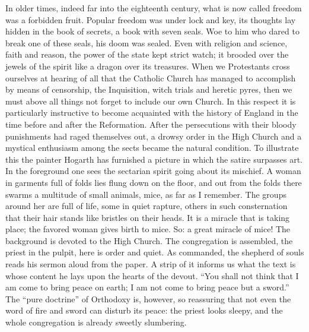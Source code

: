 \documentclass[12pt,a4paper,openany]{book}
\newcommand{\opage}[1]{\marginnote{\footnotesize\textit{[#1]}}}
\begin{document}
In older times, indeed far into the eighteenth
century, what is now called freedom was a forbidden
fruit. Popular freedom was under lock and key,
its thoughts lay hidden in the book of secrets, a
book with seven seals. Woe to him who dared to break one
of these seals, his doom was sealed. Even with religion
and science, faith and reason, the power of the state kept strict
watch; it brooded over the jewels of the spirit like a
dragon over its treasures. When we Protestants cross
\setcounter{footnote}{0}%
\opage{57}ourselves at hearing of all that the Catholic Church has
managed to accomplish by means of censorship, the Inquisition, witch trials
and heretic pyres, then we must above all things not
forget to include our own Church. In this respect it is
particularly instructive to become acquainted with
the history of England in the time before and after the Reformation.
After the persecutions with their bloody punishments had raged themselves out,
a drowsy order in the High Church and a mystical
enthusiasm among the sects became the natural condition. To
illustrate this the painter Hogarth has furnished
a picture in which the satire surpasses art. In the foreground
one sees the sectarian spirit going about its mischief. A
woman in garments full of folds lies flung down on the floor,
and out from the folds there swarms a multitude of small animals,
mice, as far as I remember. The groups around her
are full of life, some in quiet rapture, others in
such consternation that their hair stands like bristles
on their heads. It is a miracle that is taking place;
the favored woman gives birth to mice. So: a great
miracle of mice! The background is devoted to the High Church. The congregation
is assembled, the priest in the pulpit, here is
order and quiet. As commanded, the shepherd of souls reads his
sermon aloud from the paper. A strip of it informs
us what the text is whose content
he lays upon the hearts of the devout. ``You shall not
think that I am come to bring peace on earth;
I am not come to bring peace but a sword.'' The ``pure doctrine''
of Orthodoxy is, however, so reassuring
that not even the word of fire and sword can disturb its
peace: the priest looks sleepy, and the whole congregation
is already sweetly slumbering.
\end{document}
